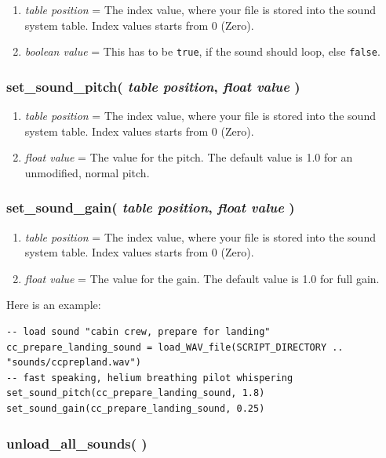 \documentclass[11pt,parskip=half,a4paper]{scrartcl}
\begin{document}
\begin{enumerate}
	\item \emph{table position} = The index value, where your file is stored into the sound system table. Index values starts from 0 (Zero).
	\item \emph{boolean value} = This has to be \verb|true|, if the sound should loop, else \verb|false|.
\end{enumerate}

\subsubsection{ set\_sound\_pitch( \emph{table position}, \emph{float value} )}

\begin{enumerate}
	\item \emph{table position} = The index value, where your file is stored into the sound system table. Index values starts from 0 (Zero).
	\item \emph{float value} = The value for the pitch. The default value is 1.0 for an unmodified, normal pitch.
\end{enumerate}

\subsubsection{ set\_sound\_gain( \emph{table position}, \emph{float value} )}

\begin{enumerate}
	\item \emph{table position} = The index value, where your file is stored into the sound system table. Index values starts from 0 (Zero).
	\item \emph{float value} = The value for the gain. The default value is 1.0 for full gain.
\end{enumerate}

Here is an example:

\begin{lstlisting}
-- load sound "cabin crew, prepare for landing"
cc_prepare_landing_sound = load_WAV_file(SCRIPT_DIRECTORY .. "sounds/ccprepland.wav")
-- fast speaking, helium breathing pilot whispering
set_sound_pitch(cc_prepare_landing_sound, 1.8)
set_sound_gain(cc_prepare_landing_sound, 0.25)
\end{lstlisting}

\subsubsection{ unload\_all\_sounds( )}
\end{document}
